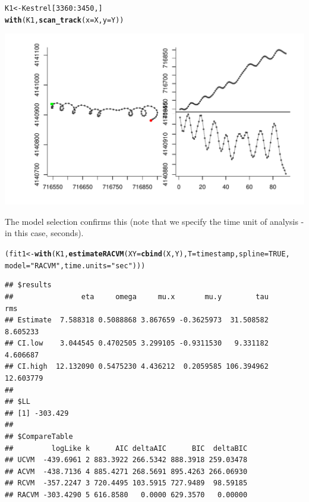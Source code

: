 \documentclass[10pt]{article}\usepackage[]{graphicx}\usepackage[]{color}
\makeatletter
\def\maxwidth{ %
  \ifdim\Gin@nat@width>\linewidth
    \linewidth
  \else
    \Gin@nat@width
  \fi
}
\newcommand{\hlnum}[1]{\textcolor[rgb]{0.686,0.059,0.569}{#1}}%
\newcommand{\hlstr}[1]{\textcolor[rgb]{0.192,0.494,0.8}{#1}}%
\newcommand{\hlopt}[1]{\textcolor[rgb]{0,0,0}{#1}}%
\newcommand{\hlstd}[1]{\textcolor[rgb]{0.345,0.345,0.345}{#1}}%
\newcommand{\hlkwb}[1]{\textcolor[rgb]{0.69,0.353,0.396}{#1}}%
\newcommand{\hlkwc}[1]{\textcolor[rgb]{0.333,0.667,0.333}{#1}}%
\newcommand{\hlkwd}[1]{\textcolor[rgb]{0.737,0.353,0.396}{\textbf{#1}}}%
\newenvironment{kframe}{%
 \def\at@end@of@kframe{}%
 \ifinner\ifhmode%
  \def\at@end@of@kframe{\end{minipage}}%
  \begin{minipage}{\columnwidth}%
 \fi\fi%
 \def\FrameCommand##1{\hskip\@totalleftmargin \hskip-\fboxsep
 \colorbox{shadecolor}{##1}\hskip-\fboxsep
     \hskip-\linewidth \hskip-\@totalleftmargin \hskip\columnwidth}%
 \MakeFramed {\advance\hsize-\width
   \@totalleftmargin\z@ \linewidth\hsize
   \@setminipage}}%
 {\par\unskip\endMakeFramed%
 \at@end@of@kframe}
\newenvironment{knitrout}{}{} %
\makeatother
\begin{document}
\begin{knitrout}
\color{fgcolor}\begin{kframe}
\begin{alltt}
  \hlstd{K1} \hlkwb{<-} \hlstd{Kestrel[}\hlnum{3360}\hlopt{:}\hlnum{3450}\hlstd{,]}
  \hlkwd{with}\hlstd{(K1,} \hlkwd{scan_track}\hlstd{(}\hlkwc{x}\hlstd{=X,} \hlkwc{y}\hlstd{=Y))}
\end{alltt}
\end{kframe}
\includegraphics[width=\maxwidth]{figure/K1-1} 

\end{knitrout}

\noindent The model selection confirms this (note that we specify the time unit of analysis - in this case, seconds).

\begin{knitrout}
\color{fgcolor}\begin{kframe}
\begin{alltt}
\hlstd{(fit1} \hlkwb{<-} \hlkwd{with}\hlstd{(K1,} \hlkwd{estimateRACVM}\hlstd{(}\hlkwc{XY} \hlstd{=} \hlkwd{cbind}\hlstd{(X,Y),} \hlkwc{T} \hlstd{= timestamp,} \hlkwc{spline}\hlstd{=}\hlnum{TRUE}\hlstd{,}
                                \hlkwc{model} \hlstd{=} \hlstr{"RACVM"}\hlstd{,} \hlkwc{time.units} \hlstd{=} \hlstr{"sec"}\hlstd{)))}
\end{alltt}
\begin{verbatim}
## $results
##                eta     omega     mu.x       mu.y        tau       rms
## Estimate  7.588318 0.5088868 3.867659 -0.3625973  31.508582  8.605233
## CI.low    3.044545 0.4702505 3.299105 -0.9311530   9.331182  4.606687
## CI.high  12.132090 0.5475230 4.436212  0.2059585 106.394962 12.603779
## 
## $LL
## [1] -303.429
## 
## $CompareTable
##         logLike k      AIC deltaAIC      BIC  deltaBIC
## UCVM  -439.6961 2 883.3922 266.5342 888.3918 259.03478
## ACVM  -438.7136 4 885.4271 268.5691 895.4263 266.06930
## RCVM  -357.2247 3 720.4495 103.5915 727.9489  98.59185
## RACVM -303.4290 5 616.8580   0.0000 629.3570   0.00000
\end{verbatim}
\end{kframe}
\end{knitrout}
\end{document}
